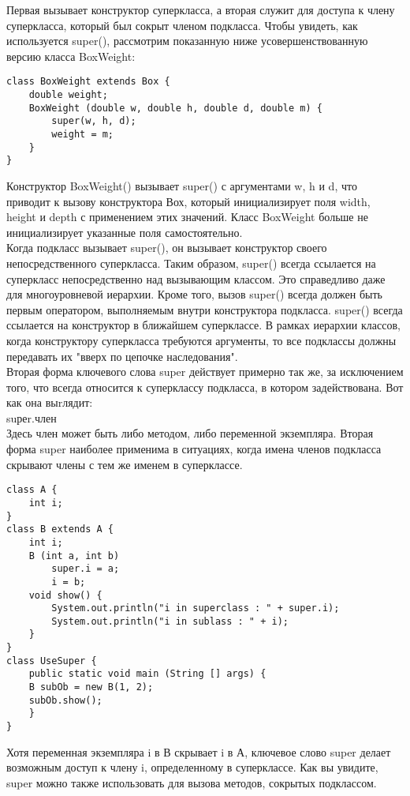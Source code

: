 Первая вызывает конструктор суперкласса, а вторая служит для доступа к члену суперкласса, который был сокрыт членом подкласса. Чтобы увидеть, как используется super(), рассмотрим показанную ниже усовершенствованную версию класса BoxWeight: \\
\begin{lstlisting}
class BoxWeight extends Box {
    double weight; 
    BoxWeight (double w, double h, double d, double m) {
        super(w, h, d); 
        weight = m;
    }
}
\end{lstlisting}
Конструктор BoxWeight() вызывает super() с аргументами w, h и d, что приводит к вызову конструктора Вох, который инициализирует поля width, height и depth с применением этих значений. Класс BoxWeight больше не инициализирует указанные поля самостоятельно. \\
Когда подкласс вызывает super(), он вызывает конструктор своего непосредственного суперкласса. Таким образом, super() всегда ссылается на суперкласс непосредственно над вызывающим классом. Это справедливо даже для многоуровневой иерархии. Кроме того, вызов super() всегда должен быть первым оператором, выполняемым внутри конструктора подкласса. super() всегда ссылается на конструктор в ближайшем суперклассе. В рамках иерархии классов, когда конструктору суперкласса требуются аргументы, то все подклассы должны передавать их "вверх по цепочке наследования".  \\
Вторая форма ключевого слова super действует примерно так же, за исключением того, что всегда относится к суперклассу подкласса, в котором задействована. Вот как она выrлядит: \\
suреr.член \\
Здесь член может быть либо методом, либо переменной экземпляра.
Вторая форма super наиболее применима в ситуациях, когда имена членов подкласса скрывают члены с тем же именем в суперклассе. \\
\begin{lstlisting}
class A {
    int i; 
}
class B extends A {
    int i;
    B (int a, int b)
        super.i = a;
        i = b;
    void show() {
        System.out.println("i in superclass : " + super.i);
        System.out.println("i in sublass : " + i);
    }
}
class UseSuper {
    public static void main (String [] args) {
    B subOb = new B(1, 2);
    subOb.show(); 
    }
}
\end{lstlisting}
Хотя переменная экземпляра i в В скрывает i в А, ключевое слово super делает возможным доступ к члену i, определенному в суперклассе. Как вы увидите, super можно также использовать для вызова методов, сокрытых подклассом. \\
